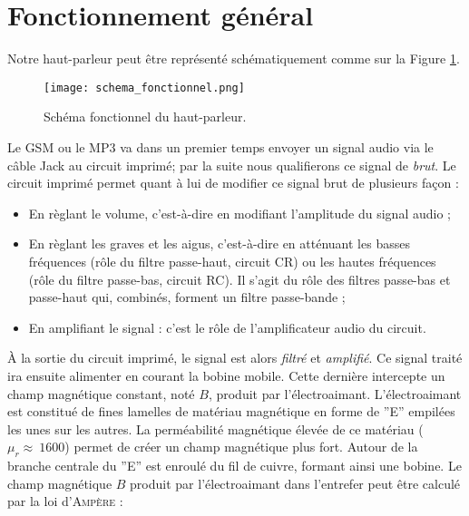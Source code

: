 

\section{Fonctionnement général}
Notre haut-parleur peut être représenté schématiquement comme sur la Figure \ref{block-diagram-hp}.

\begin{figure}[!htb]
	\centering
	\texttt{[image: schema\_fonctionnel.png]}
	\caption{Schéma fonctionnel du haut-parleur.}
	\label{block-diagram-hp}
\end{figure}

Le GSM ou le MP3 va dans un premier temps envoyer un signal audio via le câble Jack au circuit
imprimé; par la suite nous qualifierons ce signal de \textit{brut}. Le circuit imprimé permet
quant à lui de modifier ce signal brut de plusieurs façon : 

\begin{itemize}
	\item En règlant le volume, c'est-à-dire en modifiant l'amplitude du signal audio ;
	\item En règlant les graves et les aigus, c'est-à-dire en atténuant les basses fréquences
	(rôle du filtre passe-haut, circuit CR) ou les hautes
	fréquences (rôle du filtre passe-bas, circuit RC). Il s'agit du rôle des filtres passe-bas 
	et passe-haut qui,  combinés, forment un filtre passe-bande ;
	\item En amplifiant le signal : c'est le rôle de l'amplificateur audio du circuit.
\end{itemize}

À la sortie du circuit imprimé, le signal est alors \textit{filtré} et \textit{amplifié}.
Ce signal traité ira ensuite alimenter en courant la bobine mobile. Cette 
dernière intercepte un champ magnétique constant, noté $B$, produit par l'électroaimant.
L'électroaimant est constitué de fines lamelles de matériau magnétique en forme de ''E'' 
empilées les unes sur les autres. La perméabilité magnétique élevée de ce matériau
($\mu_r \approx \ 1600$) permet de créer un champ magnétique plus fort. Autour de la branche
centrale du ''E'' est enroulé du fil de cuivre, formant ainsi une bobine.
Le champ magnétique $B$ produit par l'électroaimant dans l'entrefer peut être calculé par la 
loi d'\textsc{Ampère} :

